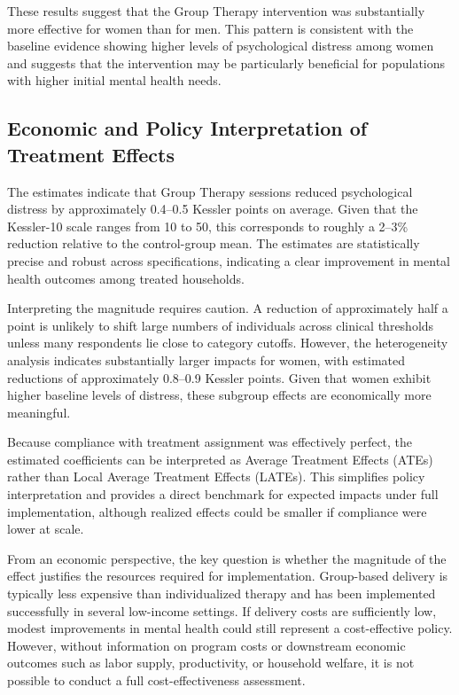 \documentclass[12pt]{article}
\begin{document}
These results suggest that the Group Therapy intervention was substantially more effective for women than for men. This pattern is consistent with the baseline evidence showing higher levels of psychological distress among women and suggests that the intervention may be particularly beneficial for populations with higher initial mental health needs.


\subsection{Economic and Policy Interpretation of Treatment Effects}

The estimates indicate that Group Therapy sessions reduced psychological distress by approximately 0.4--0.5 Kessler points on average. Given that the Kessler-10 scale ranges from 10 to 50, this corresponds to roughly a 2--3\% reduction relative to the control-group mean. The estimates are statistically precise and robust across specifications, indicating a clear improvement in mental health outcomes among treated households.

Interpreting the magnitude requires caution. A reduction of approximately half a point is unlikely to shift large numbers of individuals across clinical thresholds unless many respondents lie close to category cutoffs. However, the heterogeneity analysis indicates substantially larger impacts for women, with estimated reductions of approximately 0.8--0.9 Kessler points. Given that women exhibit higher baseline levels of distress, these subgroup effects are economically more meaningful.

Because compliance with treatment assignment was effectively perfect, the estimated coefficients can be interpreted as Average Treatment Effects (ATEs) rather than Local Average Treatment Effects (LATEs). This simplifies policy interpretation and provides a direct benchmark for expected impacts under full implementation, although realized effects could be smaller if compliance were lower at scale.

From an economic perspective, the key question is whether the magnitude of the effect justifies the resources required for implementation. Group-based delivery is typically less expensive than individualized therapy and has been implemented successfully in several low-income settings. If delivery costs are sufficiently low, modest improvements in mental health could still represent a cost-effective policy. However, without information on program costs or downstream economic outcomes such as labor supply, productivity, or household welfare, it is not possible to conduct a full cost-effectiveness assessment.
\end{document}
